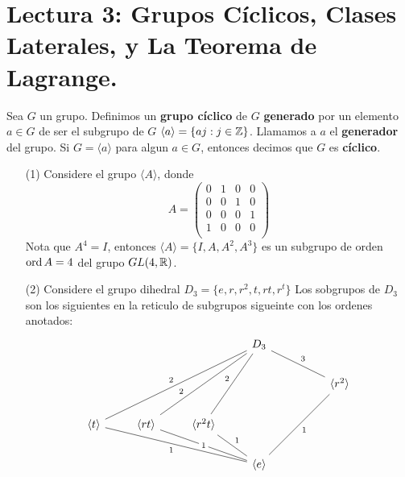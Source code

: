 \section*{Lectura 3: Grupos C\'iclicos, Clases Laterales, y La Teorema de
Lagrange.}

\begin{definition}
    Sea $G$ un grupo. Definimos un  \textbf{grupo c\'iclico} de $G$
    \textbf{generado} por un elemento $a \in G$ de ser el subgrupo de $G$
    $\langle a \rangle=\{aj : j \in \mathbb{Z}\}$. Llamamos a $a$ el  \textbf{generador}
    del grupo. Si $G=\langle a \rangle$ para algun $a \in G$, entonces decimos
    que $G$ es  \textbf{c\'iclico}.
\end{definition}

\begin{example}\label{}
    \begin{enumerate}
        \item[(1)] Considere el grupo $\langle A \rangle$, donde
            \begin{equation*}
              A=\begin{pmatrix}
                    0   &   1   &   0   &   0   \\
                    0   &   0   &   1   &   0   \\
                    0   &   0   &   0   &   1   \\
                    1   &   0   &   0   &   0   \\
                \end{pmatrix}
            \end{equation*}
            Nota que $A^4=I$, entonces  $\langle A \rangle=\{I,A,A^2,A^3\}$ es
        un subgrupo de orden $\operatorname{ord}{A}=4$ del grupo $GL(4,\mathbb{R})$.

    \item[(2)] Considere el grupo dihedral $D_3=\{e,r,r^2,t,rt,r^t\}$ Los
        sobgrupos de $D_3$ son los siguientes en la reticulo de subgrupos
        sigueinte con los ordenes anotados:
        \[\begin{tikzcd}
	&&& {D_3} \\
	&&&&& {\langle r^2 \rangle} \\
	{\langle t \rangle} & {\langle rt \rangle} & {\langle r^2t \rangle} \\
	&&& {\langle e \rangle}
	\arrow["2"', no head, from=1-4, to=3-1]
	\arrow["2"'{pos=0.7}, no head, from=1-4, to=3-2]
	\arrow["2"', no head, from=1-4, to=3-3]
	\arrow["3", no head, from=1-4, to=2-6]
	\arrow["1", no head, from=2-6, to=4-4]
	\arrow["1", no head, from=3-3, to=4-4]
	\arrow["1"{description}, no head, from=3-2, to=4-4]
	\arrow["1"', no head, from=3-1, to=4-4]
\end{tikzcd}\]
    \end{enumerate}
\end{example}

